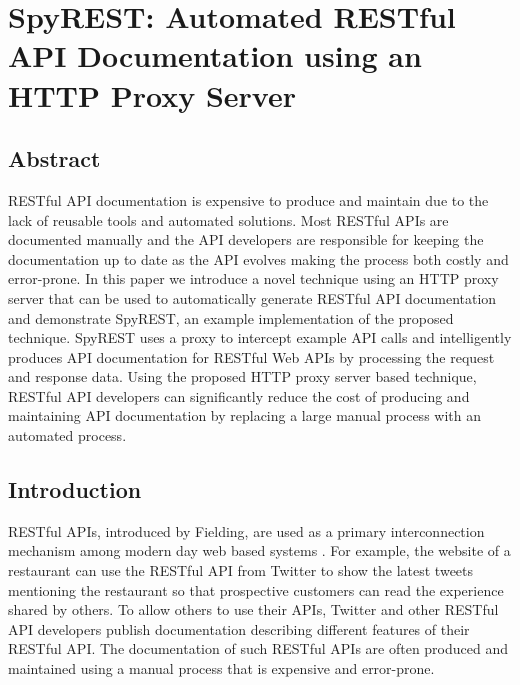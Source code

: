 \chapter{SpyREST: Automated RESTful API Documentation using an HTTP Proxy Server}




\section{Abstract}
RESTful API documentation is expensive to produce and maintain due to the lack of reusable tools and automated solutions. Most RESTful APIs are documented manually and the API developers are responsible for keeping the documentation up to date as the API evolves making the process both costly and error-prone. In this paper we introduce a novel technique using an HTTP proxy server that can be used to automatically generate RESTful API documentation and demonstrate SpyREST, an example implementation of the proposed technique. SpyREST uses a proxy to intercept example API calls and intelligently produces API documentation for RESTful Web APIs by processing the request and response data. Using the proposed HTTP proxy server based technique, RESTful API developers can significantly reduce the cost of producing and maintaining API documentation by replacing a large manual process with an automated process.




\section{Introduction}
RESTful APIs, introduced by Fielding, are used as a primary interconnection mechanism among modern day web based systems \cite{Fielding_rest}. For example, the website of a restaurant can use the RESTful API from Twitter to show the latest tweets mentioning the restaurant so that prospective customers can read the experience shared by others. To allow others to use their APIs, Twitter and other RESTful API developers publish documentation describing different features of their RESTful API. The documentation of such RESTful APIs are often produced and maintained using a manual process that is expensive and error-prone.

